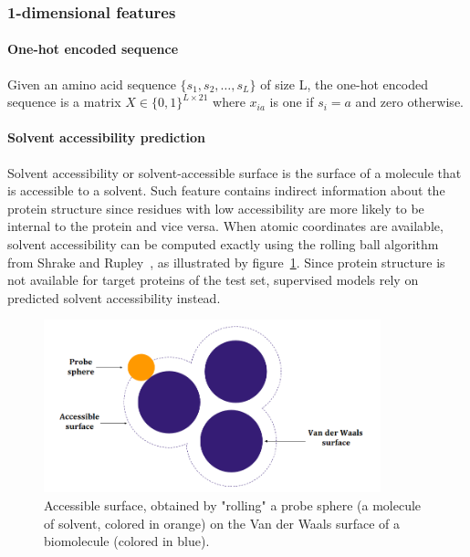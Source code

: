     \subsubsection{1-dimensional features}

        \paragraph{One-hot encoded sequence}

            Given an amino acid sequence $\{s_1, s_2, \ldots,
            s_L\}$ of size L, the one-hot encoded sequence
            is a matrix $X \in \{0, 1\}^{L \times 21}$
            where $x_{ia}$ is one if $s_i = a$ and zero otherwise.

        \paragraph{Solvent accessibility prediction}

            Solvent accessibility or solvent-accessible surface is the surface of
            a molecule that is accessible to a solvent. Such feature contains indirect
            information about the protein structure since residues with low accessibility
            are more likely to be internal to the protein and vice versa.
            When atomic coordinates are available, solvent accessibility can be computed exactly
            using the rolling ball algorithm from Shrake and Rupley~\cite{shrake1973environment},
            as illustrated by figure~\ref{rollingball}.
            Since protein structure is not available for target proteins of the test set,
            supervised models rely on predicted solvent accessibility instead.

            \begin{figure}[H]
                \begin{center}
                    \includegraphics[height=5cm, keepaspectratio]{imgs/accessibility.png}
                    \caption{Accessible surface, obtained by "rolling" a probe sphere (a molecule
                        of solvent, colored in orange) on the Van der Waals surface of a biomolecule
                        (colored in blue).}
                    \label{rollingball}
                \end{center}
            \end{figure}

